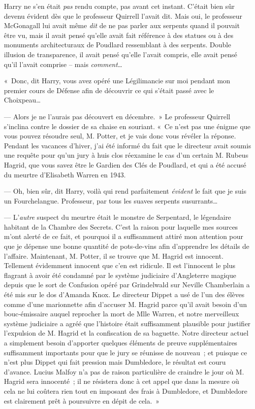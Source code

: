 Harry ne s'en était \emph{pas} rendu compte, pas avant cet instant. C'était bien sûr devenu évident dès que le professeur Quirrell l'avait dit. Mais oui, le professeur McGonagall lui avait même \emph{dit} de ne pas parler aux serpents quand il pouvait être vu, mais il avait pensé qu'elle avait fait référence à des statues ou à des monuments architecturaux de Poudlard ressemblant à des serpents. Double illusion de transparence, il avait pensé qu'elle l'avait compris, elle avait pensé qu'il l'avait comprise -- mais \emph{comment}…

«~Donc, dit Harry, vous avez opéré une Légilimancie sur moi pendant mon premier cours de Défense afin de découvrir ce qui s'était passé avec le Choixpeau…

--- Alors je ne l'aurais pas découvert en décembre.~» Le professeur Quirrell s'inclina contre le dossier de sa chaise en souriant. «~Ce n'est pas une énigme que vous pouvez résoudre seul, M. Potter, et je vais donc vous révéler la réponse. Pendant les vacances d'hiver, j'ai été informé du fait que le directeur avait soumis une requête pour qu'un jury à huis clos réexamine le cas d'un certain M. Rubeus Hagrid, que vous savez être le Gardien des Clés de Poudlard, et qui a été accusé du meurtre d'Elisabeth Warren en 1943.

--- Oh, bien sûr, dit Harry, voilà qui rend parfaitement \emph{évident} le fait que je suis un Fourchelangue. Professeur, par tous les suaves serpents susurrants…

--- L'\emph{autre} suspect du meurtre était le monstre de Serpentard, le légendaire habitant de la Chambre des Secrets. C'est la raison pour laquelle mes sources m'ont alerté de ce fait, et pourquoi il a suffisamment attiré mon attention pour que je dépense une bonne quantité de pots-de-vins afin d'apprendre les détails de l'affaire. Maintenant, M. Potter, il se trouve que M. Hagrid est innocent. Tellement évidemment innocent que c'en est ridicule. Il est l'innocent le plus flagrant à avoir été condamné par le système judiciaire d'Angleterre magique depuis que le sort de Confusion opéré par Grindelwald sur Neville Chamberlain a été mis sur le dos d'Amanda Knox. Le directeur Dippet a usé de l'un des élèves comme d'une marionnette afin d'accuser M. Hagrid parce qu'il avait besoin d'un bouc-émissaire auquel reprocher la mort de Mlle Warren, et notre merveilleux système judiciaire a agréé que l'histoire était suffisamment plausible pour justifier l'expulsion de M. Hagrid et la confiscation de sa baguette. Notre directeur actuel a simplement besoin d'apporter quelques éléments de preuve supplémentaires suffisamment importants pour que le jury se réunisse de nouveau~; et puisque ce n'est plus Dippet qui fait pression mais Dumbledore, le résultat est couru d'avance. Lucius Malfoy n'a pas de raison particulière de craindre le jour où M. Hagrid sera innocenté~; il ne résistera donc à cet appel que dans la mesure où cela ne lui coûtera rien tout en imposant des frais à Dumbledore, et Dumbledore est clairement prêt à poursuivre en dépit de cela.~»

